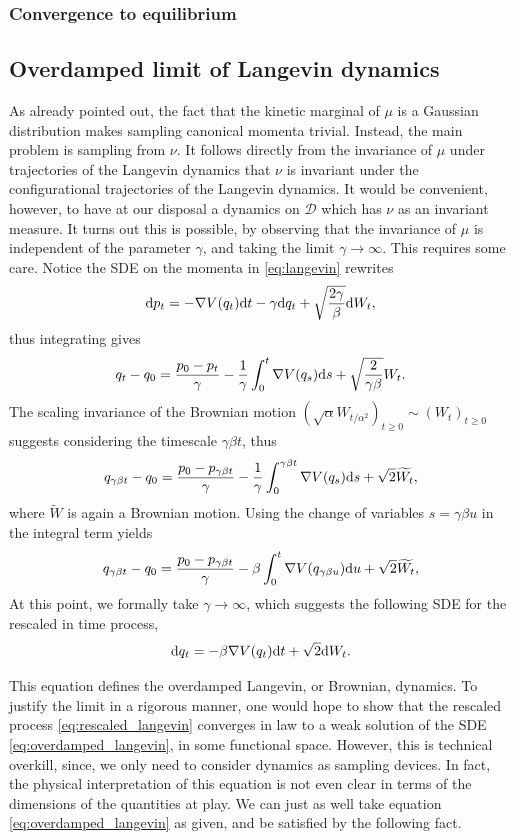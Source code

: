     \subsubsection{Convergence to equilibrium}

\subsection{Overdamped limit of Langevin dynamics}
    As already pointed out, the fact that the kinetic marginal of $\mu$ is a Gaussian distribution makes sampling canonical momenta trivial. 
    Instead, the main problem is sampling from $\nu$. It follows directly from the invariance of $\mu$ under trajectories of the Langevin dynamics that $\nu$ is invariant under the configurational trajectories of the Langevin dynamics.
    It would be convenient, however, to have at our disposal a dynamics on $\mathcal D$ which has $\nu$ as an invariant measure.
    It turns out this is possible, by observing that the invariance of $\mu$ is independent of the parameter $\gamma$, and taking the limit $\gamma\to\infty$. This requires some care.
    Notice the SDE on the momenta in \eqref{eq:langevin} rewrites 
    \[\mathrm{d} p_t=-\nabla V(q_t)\mathrm{d} t-\gamma \mathrm{d} q_t+\sqrt{\frac{2\gamma}\beta}\mathrm{d} W_t,\]
    thus integrating gives
    \[q_t-q_0=\frac{p_0-p_t}\gamma -\frac{1}\gamma\int_0^t\nabla V(q_s)\mathrm{d} s +\sqrt{\frac{2}{\gamma\beta}}W_t.\]
    The scaling invariance of the Brownian motion $(\sqrt{\alpha}W_{t/\alpha^2})_{t\geq 0}\sim (W_t)_{t\geq 0}$ suggests considering the timescale $\gamma\beta t$, thus
    \[q_{\gamma\beta t}-q_0=\frac{p_0-p_{\gamma\beta t}}\gamma-\frac1{\gamma}\int_0^{\gamma\beta t}\nabla V(q_s)\mathrm{d} s +\sqrt{2}\widetilde{W_t},\]
    where $\widetilde W$ is again a Brownian motion. Using the change of variables $s=\gamma \beta u$ in the integral term yields
    \begin{equation}\label{eq:rescaled_langevin}q_{\gamma\beta t}-q_0=\frac{p_0-p_{\gamma\beta t}}\gamma-\beta\int_0^{t}\nabla V(q_{\gamma\beta u})\mathrm{d} u +\sqrt{2}\widetilde{W_t},\end{equation}
    At this point, we formally take $\gamma\to\infty$, which suggests the following SDE for the rescaled in time process,
    \begin{equation}
        \label{eq:overdamped_langevin}
        \mathrm{d} q_t=-\beta \nabla V(q_t)\mathrm{d} t+\sqrt{2}\mathrm{d} W_t.
    \end{equation}
    
    This equation defines the overdamped Langevin, or Brownian, dynamics.
    To justify the limit in a rigorous manner, one would hope to show that the rescaled process \eqref{eq:rescaled_langevin} converges in law to a weak solution of the SDE \eqref{eq:overdamped_langevin}, in some functional space.
    However, this is technical overkill, since, we only need to consider dynamics as sampling devices. In fact, the physical interpretation of this equation is not even clear in terms of the dimensions of the quantities at play.
    We can just as well take equation \eqref{eq:overdamped_langevin} as given, and be satisfied by the following fact.

